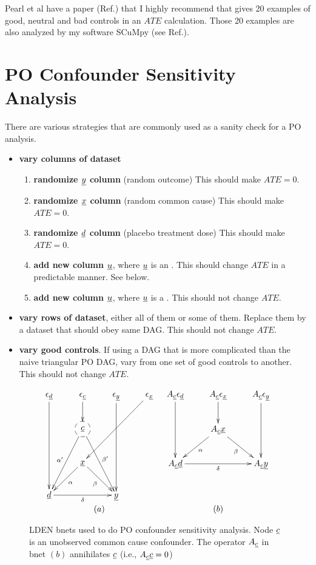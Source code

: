 Pearl et al have a paper
(Ref.\cite{pearl-good-neutral-bad})
that I highly recommend
that gives 20 examples
of good, neutral and
bad controls
in an $ATE$ calculation.
Those 20 examples are also analyzed
by my software SCuMpy (see Ref.\cite{scumpy}).

\section{PO Confounder Sensitivity Analysis}
\label{intro-pot-out-sensitivity}

There are various  strategies that are commonly
used
as a sanity check for a
PO analysis.
\begin{itemize}
\item {\bf vary columns of dataset}
\begin{enumerate}
\item {\bf randomize $\rvy$ column} (random outcome) This should make $ATE=0$.
\item {\bf randomize $\rvx$ column}
(random common cause) This should make $ATE=0$.
\item {\bf randomize $\rvd$ column} (placebo treatment dose) This should make $ATE=0$.
\item {\bf add new column $\rvu$}, where $\rvu$ is an .
This should change $ATE$
in a predictable manner. See below.
\item {\bf add new column $\rvu$}, where $\rvu$ is a .
This should not change $ATE$.
\end{enumerate}
\item {\bf vary rows of dataset},
either all of them or some of them.
Replace them by a dataset that
should obey same DAG.
This should not change $ATE$.
\item {\bf vary good controls}. If using
a DAG that is more complicated than the
naive triangular PO DAG,
vary from one set of good
controls to another.
This should not change $ATE$.

\end{itemize}


\begin{figure}[h!]
$$
\begin{array}{cc}
\xymatrix{
\eps_\rvd\ar[ddd]
&\eps_\rvc\ar[d]
&\eps_\rvy\ar[ddd]
&\eps_\rvx\ar[lldd]
\\
&*++[F-o]{\rvc}\ar[ldd]_{\alp'}
\ar[rdd]^{\beta'}
\\
&\rvx
\ar[ld]^\alp
\ar[rd]_\beta
\\
\rvd\ar[rr]_\delta
&&\rvy
}
&
\xymatrix{
A_\rvc\eps_\rvd\ar[dd]
&A_\rvc\eps_\rvx\ar[d]
&A_\rvc\eps_\rvy\ar[dd]
\\
&A_\rvc\rvx
\ar[ld]^\alp
\ar[rd]_\beta
\\
A_\rvc\rvd\ar[rr]_\delta
&&A_\rvc\rvy
}
\\
(a)&(b)
\end{array}
$$
\caption{LDEN bnets used to do PO confounder
sensitivity analysis.
Node $\rvc$
is an unobserved common cause confounder.
The operator $A_\rvc$ in bnet $(b)$ annihilates $\rvc$ (i.e., $A_\rvc \rvc =0$)}
\label{eq-po-sen-ana}
\end{figure}

